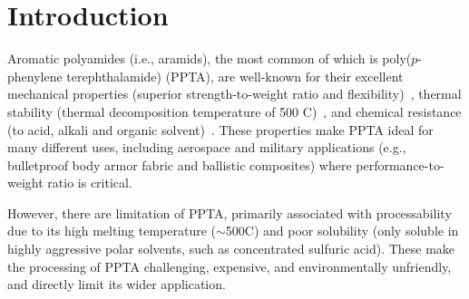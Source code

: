 \documentclass[journal=langd5,manuscript=article]{achemso}
\begin{document}
\section{Introduction}
Aromatic polyamides (i.e., aramids), the most common of which is poly($p$-phenylene terephthalamide) (PPTA), are well-known for their excellent mechanical properties (superior strength-to-weight ratio and flexibility)~\cite{shim2001dynamic,knijnenberg2010synthesis}, thermal stability (thermal decomposition temperature of 500\textdegree{} C)~\cite{yang1993kevlar,mark1962aromatic}, and chemical resistance (to acid, alkali and organic solvent)~\cite{sockalingam2017recent,kim2008modified,krishnan2010numerical,rao2001structure,hogg2006composites}. 
These properties make PPTA ideal for many different uses, including aerospace and military applications (e.g., bulletproof body armor fabric and ballistic composites) where performance-to-weight ratio is critical. \cite{brauckmann2016structural,deshmukh2016conformational,chen2016advanced,dobb1979microvoids}

However, there are limitation of PPTA, primarily associated with processability due to its high melting temperature ($\sim$500\textdegree{}C) and poor solubility (only soluble in highly aggressive polar solvents, such as concentrated sulfuric acid).
These make the processing of PPTA challenging, expensive, and environmentally unfriendly, and directly limit its wider application.~\cite{debeaupte1992situ,ferreiro2005polyisophthalamides,ferrero2002synthesis,zhou2017synthesis,garcia2010high,huang2013solvent}
\end{document}
